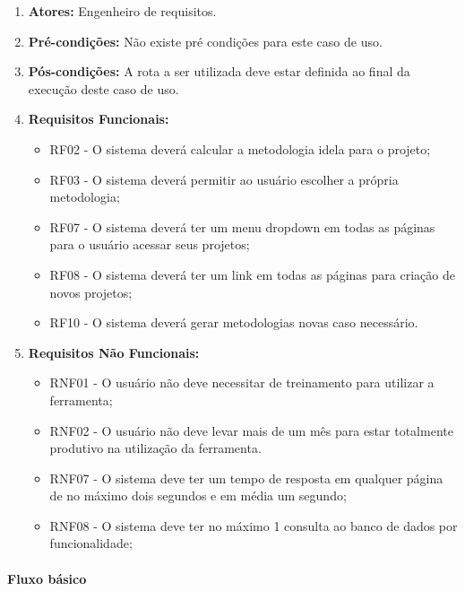 \begin{enumerate}
	\item \textbf{Atores:}
		Engenheiro de requisitos. 
	\item \textbf{Pré-condições:}
		Não existe pré condições para este caso de uso.
	\item \textbf{Pós-condições:}
		A rota a ser utilizada deve estar definida ao final da execução deste caso de uso.
	\item \textbf{Requisitos Funcionais:}
		\begin{itemize}
			\item RF02 - O sistema deverá calcular a metodologia idela para o projeto;
			\item RF03 - O sistema deverá permitir ao usuário escolher a própria metodologia;
			\item RF07 - O sistema deverá ter um menu dropdown em todas as páginas para o usuário acessar seus projetos;
			\item RF08 - O sistema deverá ter um link em todas as páginas para criação de novos projetos;
			\item RF10 - O sistema deverá gerar metodologias novas caso necessário.
		\end{itemize}
	\item \textbf{Requisitos Não Funcionais:}
		\begin{itemize}
			\item RNF01 - O usuário não deve necessitar de treinamento para utilizar a ferramenta;
			\item RNF02 - O usuário não deve levar mais de um mês para estar totalmente produtivo na utilização da ferramenta.
			\item RNF07 - O sistema deve ter um tempo de resposta em qualquer página de no máximo dois segundos e em média um segundo;
			\item RNF08 - O sistema deve ter no máximo 1 consulta ao banco de dados por funcionalidade;
		\end{itemize}
\end{enumerate}

\paragraph{Fluxo básico}

